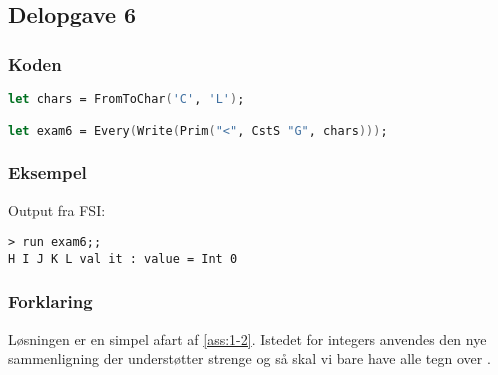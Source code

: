 \subsection{Delopgave 6}\label{ass:1-6}
\subsubsection{Koden}
\begin{lstlisting}[language=fsharp]
let chars = FromToChar('C', 'L');

let exam6 = Every(Write(Prim("<", CstS "G", chars)));
\end{lstlisting}

\subsubsection{Eksempel}
Output fra FSI:
\begin{lstlisting}
> run exam6;;
H I J K L val it : value = Int 0
\end{lstlisting}

\subsubsection{Forklaring}
Løsningen er en simpel afart af \ref{ass:1-2}. Istedet for integers anvendes den nye sammenligning der understøtter strenge og så skal vi bare have alle tegn over .
